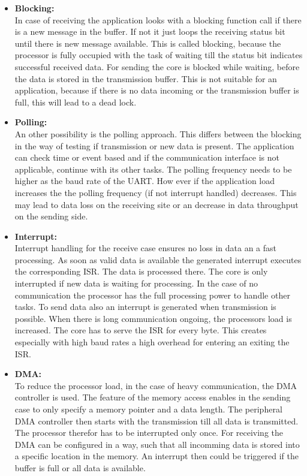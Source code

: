 \begin{itemize}
	\item \textbf{Blocking:}\\
In case of receiving the application looks with a blocking function call if there is a new message in the buffer. If not it just loops the receiving status bit until there is new message available. This is called blocking, because the processor is fully occupied with the task of waiting till the status bit indicates successful received data.
For sending the core is blocked while waiting, before the data is stored in the transmission buffer. This is not suitable for an application, because if there is no data incoming or the transmission buffer is full, this will lead to a dead lock.\\
	\item \textbf{Polling:}\\
	An other possibility is the polling approach. This differs between the blocking in the way of testing if transmission or new data is present. The application can check time or event based and if the communication interface is not applicable, continue with its other tasks. The polling frequency needs to be higher as the baud rate of the \ac{UART}. How ever if the application load increases the the polling frequency (if not interrupt handled) decreases. This may lead to data loss on the receiving site or an decrease in data throughput on the sending side.\\
	\item \textbf{Interrupt:}\\
Interrupt handling for the receive case ensures no loss in data an a fast processing. As soon as valid data is available the generated interrupt executes the corresponding \ac{ISR}. The data is processed there. The core is only interrupted if new data is waiting for processing. In the case of no communication the processor has the full processing power to handle other tasks. To send data also an interrupt is generated when transmission is possible.
When there is long communication ongoing, the processors load is increased. The core has to serve the \ac{ISR} for every byte. This creates especially with high baud rates a high overhead for entering an exiting the \ac{ISR}.\\
	\item \textbf{\ac{DMA}:}\\
	To reduce the processor load, in the case of heavy communication, the \ac{DMA} controller is used. The feature of the memory access enables in the sending case to only specify a memory pointer and a data length. The peripheral \ac{DMA} controller then starts with the transmission till all data is transmitted. The processor therefor has to be interrupted only once. For receiving the \ac{DMA} can be configured in a way, such that all incomming data is stored into a specific location in the memory. An interrupt then could be triggered if the buffer is full or all data is available.\\

\end{itemize}
